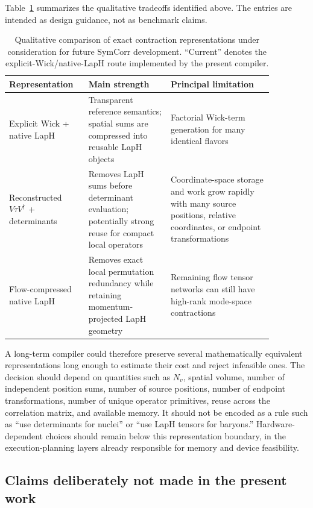 Table~\ref{tab:future_representation_tradeoffs} summarizes the qualitative
tradeoffs identified above. The entries are intended as design guidance, not
as benchmark claims.

\begin{table}[t]
\centering
\caption{Qualitative comparison of exact contraction representations under
consideration for future SymCorr development. ``Current'' denotes the
explicit-Wick/native-LapH route implemented by the present compiler.}
\label{tab:future_representation_tradeoffs}
\begin{tabular}{p{0.23\linewidth}p{0.29\linewidth}p{0.35\linewidth}}
\toprule
Representation & Main strength & Principal limitation \\
\midrule
Explicit Wick + native LapH & Transparent reference semantics; spatial sums are compressed into reusable LapH objects & Factorial Wick-term generation for many identical flavors \\
Reconstructed \(V\tau V^\dagger\) + determinants & Removes LapH sums before determinant evaluation; potentially strong reuse for compact local operators & Coordinate-space storage and work grow rapidly with many source positions, relative coordinates, or endpoint transformations \\
Flow-compressed native LapH & Removes exact local permutation redundancy while retaining momentum-projected LapH geometry & Remaining flow tensor networks can still have high-rank mode-space contractions \\
\bottomrule
\end{tabular}
\end{table}

A long-term compiler could therefore preserve several mathematically equivalent
representations long enough to estimate their cost and reject infeasible ones.
The decision should depend on quantities such as \(N_v\), spatial volume,
number of independent position sums, number of source positions, number of
endpoint transformations, number of unique operator primitives, reuse across
the correlation matrix, and available memory. It should not be encoded as a
rule such as ``use determinants for nuclei'' or ``use LapH tensors for
baryons.'' Hardware-dependent choices should remain below this representation
boundary, in the execution-planning layers already responsible for memory and
device feasibility.

\subsection{Claims deliberately not made in the present work}
\label{subsec:future_nonclaims}


